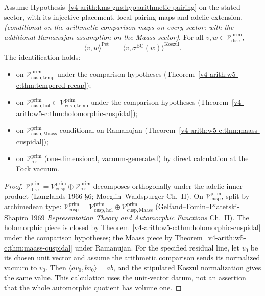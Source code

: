 \begin{theorem}
\label{v4-arith:w5-c:thm:discrete-core-identity}
Assume Hypothesis~\ref{v4-arith:kms-gns:hyp:arithmetic-pairing}
on the stated sector, with its injective placement, local pairing maps
and adelic extension.
\emph{(conditional on the arithmetic comparison maps on every sector;
with the additional Ramanujan assumption on the Maass sector)}. For all
\(v,w\in\mathcal{V}^{\mathrm{prim}}_{\mathrm{disc}}\),
\begin{equation}
\label{v4-arith:w5-c:eq:discrete-core-identity}
\langle v,w\rangle^{\mathrm{Pet}}
\;=\;\langle v,\sigma^{\mathrm{BC}}(w)\rangle^{\mathrm{Koszul}}.
\end{equation}
The identification holds:
\begin{itemize}
\item on
\(\mathcal{V}^{\mathrm{prim}}_{\mathrm{cusp,temp}}\) under the comparison hypotheses
(Theorem~\ref{v4-arith:w5-c:thm:tempered-recap});
\item on
\(\mathcal{V}^{\mathrm{prim}}_{\mathrm{cusp,hol}}\subset\mathcal{V}^{\mathrm{prim}}_{\mathrm{cusp,temp}}\)
under the comparison hypotheses
(Theorem~\ref{v4-arith:w5-c:thm:holomorphic-cuspidal});
\item on
\(\mathcal{V}^{\mathrm{prim}}_{\mathrm{cusp,Maass}}\) conditional on
Ramanujan
(Theorem~\ref{v4-arith:w5-c:thm:maass-cuspidal});
\item on
\(\mathcal{V}^{\mathrm{prim}}_{\mathrm{res}}\) (one-dimensional,
vacuum-generated) by direct calculation at the Fock vacuum.
\end{itemize}
\end{theorem}

\begin{proof}
\(\mathcal{V}^{\mathrm{prim}}_{\mathrm{disc}}=\mathcal{V}^{\mathrm{prim}}_{\mathrm{cusp}}\oplus\mathcal{V}^{\mathrm{prim}}_{\mathrm{res}}\)
decomposes orthogonally under the adelic inner product (Langlands 1966
\S6; Moeglin--Waldspurger Ch.~II). On
\(\mathcal{V}^{\mathrm{prim}}_{\mathrm{cusp}}\), split by archimedean
type:
\(\mathcal{V}^{\mathrm{prim}}_{\mathrm{cusp}}=\mathcal{V}^{\mathrm{prim}}_{\mathrm{cusp,hol}}\oplus\mathcal{V}^{\mathrm{prim}}_{\mathrm{cusp,Maass}}\)
(Gelfand--Fomin--Piatetski-Shapiro 1969 \emph{Representation Theory
and Automorphic Functions} Ch.~II). The holomorphic piece is closed
by Theorem~\ref{v4-arith:w5-c:thm:holomorphic-cuspidal} under the comparison hypotheses;
the Maass piece by
Theorem~\ref{v4-arith:w5-c:thm:maass-cuspidal} under Ramanujan.
For the specified residual line, let \(v_0\) be its chosen unit
vector and assume the arithmetic comparison sends its normalized
vacuum to \(v_0\). Then
\(\langle av_0,bv_0\rangle=a\overline b\), and the stipulated
Koszul normalization gives the same value. This calculation uses
the unit-vector datum, not an assertion that the whole automorphic
quotient has volume one.
\end{proof}

